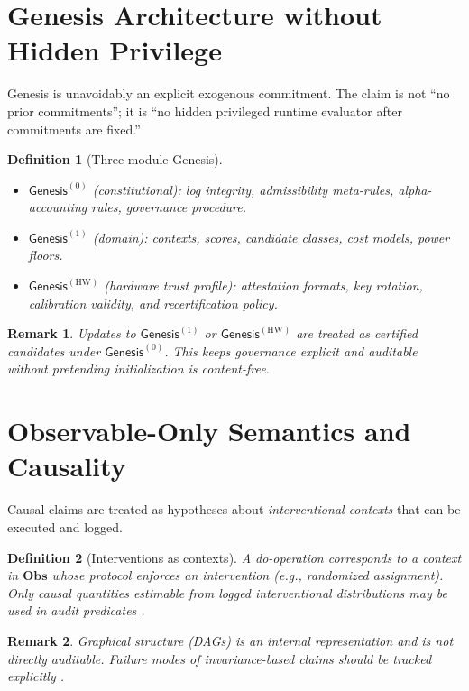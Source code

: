 \documentclass[11pt,a4paper]{article}
\newtheorem{definition}{Definition}[section]
\newtheorem{remark}{Remark}[section]
\newcommand{\Obs}{\mathbf{Obs}}
\newcommand{\Gen}{\mathsf{Genesis}}
\begin{document}
\section{Genesis Architecture without Hidden Privilege}

Genesis is unavoidably an explicit exogenous commitment.
The claim is not ``no prior commitments''; it is ``no hidden privileged runtime evaluator after commitments are fixed.''

\begin{definition}[Three-module Genesis]
\begin{itemize}[leftmargin=*]
\item $\Gen^{(0)}$ (constitutional): log integrity, admissibility meta-rules, alpha-accounting rules, governance procedure.
\item $\Gen^{(1)}$ (domain): contexts, scores, candidate classes, cost models, power floors.
\item $\Gen^{(\mathrm{HW})}$ (hardware trust profile): attestation formats, key rotation, calibration validity, and recertification policy.
\end{itemize}
\end{definition}

\begin{remark}
Updates to $\Gen^{(1)}$ or $\Gen^{(\mathrm{HW})}$ are treated as certified candidates under $\Gen^{(0)}$.
This keeps governance explicit and auditable without pretending initialization is content-free.
\end{remark}

\section{Observable-Only Semantics and Causality}

Causal claims are treated as hypotheses about \emph{interventional contexts} that can be executed and logged.

\begin{definition}[Interventions as contexts]
A do-operation corresponds to a context in $\Obs$ whose protocol enforces an intervention (e.g., randomized assignment).
Only causal quantities estimable from logged interventional distributions may be used in audit predicates \citep{Pearl2009Causality,Peters2017Elements}.
\end{definition}

\begin{remark}
Graphical structure (DAGs) is an internal representation and is not directly auditable.
Failure modes of invariance-based claims should be tracked explicitly \citep{Arjovsky2019IRM,Rosenfeld2021IRMrisks}.
\end{remark}
\end{document}

